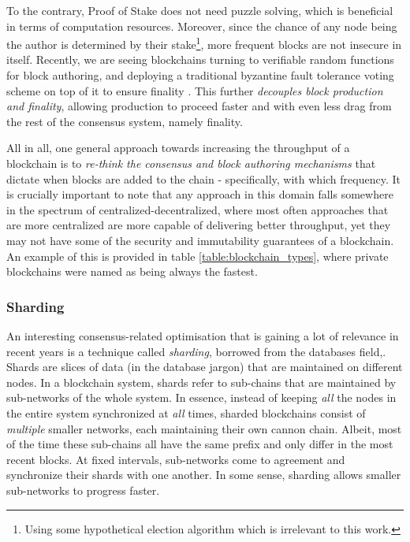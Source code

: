 To the contrary, Proof of Stake does not need puzzle solving, which is beneficial in terms of
computation resources. Moreover, since the chance of any node being the author is determined by
their stake\footnote{Using some hypothetical election algorithm which is irrelevant to this work.},
more frequent blocks are not insecure in itself. Recently, we are seeing blockchains turning to
verifiable random functions \cite{dodisVerifiableRandomFunction2005} for block authoring, and
deploying a traditional byzantine fault tolerance voting scheme on top of it to ensure finality
\cite{buterinCasperFriendlyFinality2019, stewartPosterGRANDPAFinality2019}. This further
\textit{decouples block production and finality}, allowing production to proceed faster and with
even less drag from the rest of the consensus system, namely finality.

All in all, one general approach towards increasing the throughput of a blockchain is to
\textit{re-think the consensus and block authoring mechanisms} that dictate when blocks are added to
the chain - specifically, with which frequency. It is crucially important to note that any approach
in this domain falls somewhere in the spectrum of centralized-decentralized, where most often
approaches that are more centralized are more capable of delivering better throughput, yet they may
not have some of the security and immutability guarantees of a blockchain. An example of this is
provided in table \ref{table:blockchain_types}, where private blockchains were named as being always
the fastest.

\subsubsection{Sharding}
An interesting consensus-related optimisation that is gaining a lot of relevance in recent years is
a technique called \textit{sharding}, borrowed from the databases field,. Shards are slices of data
(in the database jargon) that are maintained on different nodes. In a blockchain system, shards
refer to sub-chains that are maintained by sub-networks of the whole system. In essence, instead of
keeping \textit{all} the nodes in the entire system synchronized at \textit{all} times, sharded
blockchains consist of \textit{multiple} smaller networks, each maintaining their own cannon chain.
Albeit, most of the time these sub-chains all have the same prefix and only differ in the most
recent blocks. At fixed intervals, sub-networks come to agreement and synchronize their shards with
one another. In some sense, sharding allows smaller sub-networks to progress
faster\cite{forestierBlockcliqueScalingBlockchains2019, al-bassamChainspaceShardedSmart2017,
shreyDiPETransFrameworkDistributed2019}.

